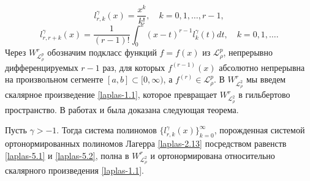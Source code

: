   \begin{equation}\label{laplas-5.1}
l_{r,k}^{\gamma}(x) =\frac{x^k}{k!}, \quad k=0,1,\ldots, r-1,
\end{equation}
  \begin{equation}\label{laplas-5.2}
l_{r,r+k}^{\gamma}(x) =\frac{1}{(r-1)!}\int_{0}^x(x-t)^{r-1}l_{k}^{\gamma}(t)dt, \quad k=0,1,\ldots.
\end{equation}
 Через $W_{\mathcal{ L}_{\rho}^p}^r$ обозначим  подкласс функций $f=f(x)$ из $\mathcal{ L}_{\rho}^p$,
непрерывно дифференцируемых $r-1$ раз, для которых $f^{(r-1)}(x)$
абсолютно непрерывна на произвольном сегменте $[a,b]\subset[0,\infty)$,
а $f^{(r)}\in \mathcal{ L}_{\rho}^p$. В $W_{\mathcal{ L}_{\rho}^2}^r$ мы введем скалярное произведение \eqref{laplas-1.1}, которое превращает $W_{\mathcal{ L}_{\rho}^2}^r$ в гильбертово пространство.
В работах  \cite{Shar11} и \cite{Shar12} была доказана следующая теорема.

\begin{theoremA}\label{laplastheo1}
Пусть $\gamma>-1$. Тогда система полиномов $\{l_{r,k}^{\gamma}(x)\}_{k=0}^\infty$, порожденная системой ортонормированных полиномов Лагерра \eqref{laplas-2.13} посредством равенств \eqref{laplas-5.1} и \eqref{laplas-5.2}, полна  в $W^r_{\mathcal{ L}^2_\rho}$ и ортонормирована относительно скалярного произведения \eqref{laplas-1.1}.
\end{theoremA}

